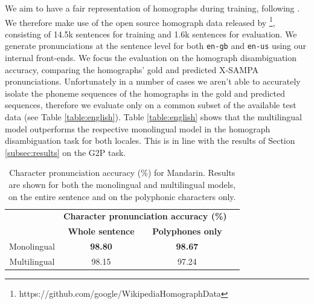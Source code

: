 We aim to have a fair representation of homographs during training, following \cite{gorman-etal-2018-improving, nicolis21_ssw, soundchoice22}.
We therefore make use of the open source homograph data released by \cite{gorman-etal-2018-improving}\footnote{https://github.com/google/WikipediaHomographData}, consisting of \mytextapprox14.5k sentences for training and \mytextapprox1.6k sentences for evaluation.
We generate pronunciations at the sentence level for both \texttt{en-gb} and \texttt{en-us} using our internal front-ends.
We focus the evaluation on the homograph disambiguation accuracy, comparing the homographs' gold and predicted X-SAMPA pronunciations. Unfortunately in a number of cases we aren't able to accurately isolate the phoneme sequences of the homographs in the gold and predicted sequences, therefore we evaluate only on a common subset of the available test data (see Table \ref{table:english}). Table \ref{table:english} shows that the multilingual model outperforms the respective monolingual model in the homograph disambiguation task for both locales. This is in line with the results of Section \ref{subsec:results} on the G2P task.


\begin{table}[t]
\centering
\begin{tabular}{cccc}

\hline
 &

\multicolumn{2}{c}{\textbf{Character pronunciation accuracy (\%)}} \\
 &
\textbf{Whole sentence} &
\textbf{Polyphones only}
\\

\hline

Monolingual &  
\textbf{98.80} &
\textbf{98.67}
\\

Multilingual & 
98.15 &
97.24
\\
\hline

\end{tabular}
\caption{Character pronunciation accuracy (\%) for Mandarin. Results are shown for both the monolingual and multilingual models, on the entire sentence and on the polyphonic characters only.}%
\label{table:mandarin}
\end{table}



